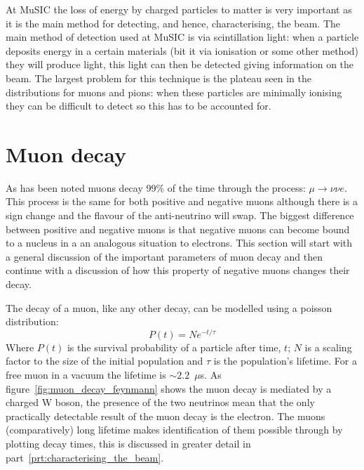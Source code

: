 At MuSIC the loss of energy by charged particles to matter is very important as it is the main method for detecting, and hence, characterising, the beam. The main method of detection used at MuSIC is via scintillation light: when a particle deposits energy in a certain materials (bit it via ionisation or some other method) they will produce light, this light can then be detected giving information on the beam. The largest problem for this technique is the plateau seen in the distributions for muons and pions: when these particles are minimally ionising they can be difficult to detect so this has to be accounted for. 
 
\section{Muon decay} %
\label{sec:muon_decay}
As has been noted muons decay 99\% of the time through the process: \( \mu \rightarrow \nu \nu e \). This process is the same for both positive and negative muons although there is a sign change and the flavour of the anti-neutrino will swap. The biggest difference between positive and negative muons is that negative muons can become bound to a nucleus in a an analogous situation to electrons. This section will start with a general discussion of the important parameters of muon decay and then continue with a discussion of how this property of negative muons changes their decay.

The decay of a muon, like any other decay, can be modelled using a poisson distribution:
\begin{equation}\label{eq:poisson}
  P(t) = Ne^{-t/\tau}
\end{equation}
Where \( P(t) \) is the survival probability of a particle after time, \( t \); \( N \) is a scaling factor to the size of the initial population and \( \tau \) is the population's lifetime. For a free muon in a vacuum the lifetime is \( \sim2.2\)~\( \mu \)s. As figure~\ref{fig:muon_decay_feynmann} shows the muon decay is mediated by a charged W boson, the presence of the two neutrinos mean that the only practically detectable result of the muon decay is the electron. The muons (comparatively) long lifetime makes identification of them possible through by plotting decay times, this is discussed in greater detail in part~\ref{prt:characterising_the_beam}. 

